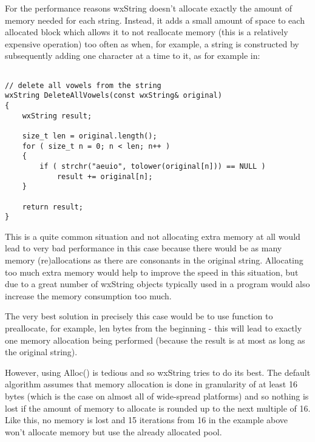 For the performance reasons wxString doesn't allocate exactly the amount of
memory needed for each string. Instead, it adds a small amount of space to each
allocated block which allows it to not reallocate memory (this is a relatively
expensive operation) too often as when, for example, a string is constructed by
subsequently adding one character at a time to it, as for example in:

\begin{verbatim}

// delete all vowels from the string
wxString DeleteAllVowels(const wxString& original)
{
    wxString result;

    size_t len = original.length();
    for ( size_t n = 0; n < len; n++ )
    {
        if ( strchr("aeuio", tolower(original[n])) == NULL )
            result += original[n];
    }

    return result;
}

\end{verbatim}

This is a quite common situation and not allocating extra memory at all would
lead to very bad performance in this case because there would be as many memory
(re)allocations as there are consonants in the original string. Allocating too
much extra memory would help to improve the speed in this situation, but due to
a great number of wxString objects typically used in a program would also
increase the memory consumption too much.

The very best solution in precisely this case would be to use 
 function to preallocate, for example, len bytes
from the beginning - this will lead to exactly one memory allocation being
performed (because the result is at most as long as the original string).

However, using Alloc() is tedious and so wxString tries to do its best. The
default algorithm assumes that memory allocation is done in granularity of at
least 16 bytes (which is the case on almost all of wide-spread platforms) and so
nothing is lost if the amount of memory to allocate is rounded up to the next
multiple of 16. Like this, no memory is lost and 15 iterations from 16 in the
example above won't allocate memory but use the already allocated pool.

